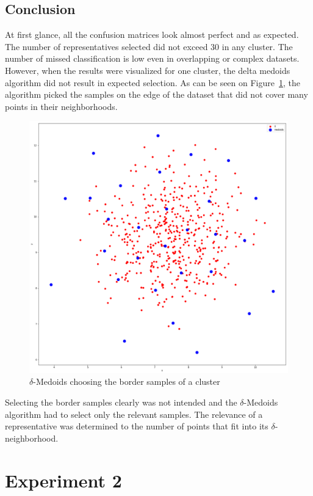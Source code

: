 \documentclass[thesis=B,english]{FITthesis}[2012/10/20]
\begin{document}
\subsection{Conclusion}
At first glance, all the confusion matrices look almost perfect and as expected.
The number of representatives selected did not exceed 30 in any cluster.
The number of missed classification is low even in overlapping or complex datasets.
However, when the results were visualized for one cluster, the delta medoids algorithm did not result in expected selection.
As can be seen on Figure~\ref{img:blobs_border_select}, the algorithm picked the samples on the edge of the dataset that did not cover many points in their neighborhoods.
\begin{figure}
   \includegraphics[width=\linewidth]{img/delta_medoids_select.png}
  \caption{$\delta$-Medoids choosing the border samples of a cluster}
  \label{img:blobs_border_select}
\end{figure}
Selecting the border samples clearly was not intended and the $\delta$-Medoids algorithm had to select only the relevant samples.
The relevance of a representative was determined to the number of points that fit into its $\delta$-neighborhood. 

\section{Experiment 2}\label{sec:exp2}
\end{document}
